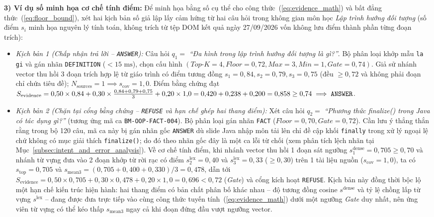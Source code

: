 \documentclass{IEEEtran}
\begin{document}
\textbf{3) Ví dụ số minh họa cơ chế tính điểm:}
Để minh họa bằng số cụ thể cho công thức~(\ref{eq:evidence_math}) và bất đẳng thức~(\ref{eq:floor_bound}), xét hai kịch bản số giả lập lấy cảm hứng từ hai câu hỏi trong không gian môn học \textit{Lập trình hướng đối tượng} (số điểm $s_i$ minh họa nguyên lý tính toán, không trích từ tệp DOM kết quả ngày 27/09/2026 vốn không lưu điểm thành phần từng đoạn trích):
\begin{itemize}
    \item \textit{Kịch bản 1 (Chấp nhận trả lời -- \texttt{ANSWER}):} Câu hỏi $q_1 =$ \textit{``Đa hình trong lập trình hướng đối tượng là gì?''}. Bộ phân loại khớp mẫu \texttt{la gi} và gán nhãn \texttt{DEFINITION} ($< 15\text{~ms}$), chọn cấu hình $(\textit{Top-K}=4, \textit{Floor}=0{,}72, \textit{Max}=3, \textit{Min}=1, \textit{Gate}=0{,}74)$. Giả sử nhánh vector thu hồi 3 đoạn trích hợp lệ từ giáo trình có điểm tương đồng $s_1 = 0{,}84, s_2 = 0{,}79, s_3 = 0{,}75$ (đều $\ge 0{,}72$ và không phải đoạn chỉ chứa tiêu đề); $N_{\text{sources}} = 1 \implies s_{\text{cov}} = 1{,}0$. Điểm bằng chứng đạt $S_{\text{evidence}} = 0{,}50 \times 0{,}84 + 0{,}30 \times \frac{0{,}84+0{,}79+0{,}75}{3} + 0{,}20 \times 1{,}0 = 0{,}420 + 0{,}238 + 0{,}200 = 0{,}858 \ge 0{,}74 \implies \text{\texttt{ANSWER}}$.
    \item \textit{Kịch bản 2 (Chặn tại cổng bằng chứng -- \texttt{REFUSE} và hạn chế ghép hai thang điểm):} Xét câu hỏi $q_2 =$ \textit{``Phương thức finalize() trong Java có tác dụng gì?''} (tương ứng mã ca \texttt{BM-OOP-FACT-004}). Bộ phân loại gán nhãn \texttt{FACT} ($\textit{Floor}=0{,}70, \textit{Gate}=0{,}72$). Cần lưu ý thẳng thắn rằng trong bộ 120 câu, mã ca này bị gán nhãn gốc \texttt{ANSWER} dù slide Java nhập môn tải lên chỉ đề cập khối \texttt{finally} trong xử lý ngoại lệ chứ không có mục giải thích \texttt{finalize()}; do đó theo nhãn gốc đây là một ca lỗi từ chối (xem phân tích lệch nhãn tại Mục~\ref{subsec:intent_and_error_analysis}). Về cơ chế tính điểm, khi nhánh vector thu hồi 1 đoạn sát ngưỡng $s_1^{\text{dense}} = 0{,}705 \ge 0{,}70$ và nhánh từ vựng đưa vào 2 đoạn khớp từ rời rạc có điểm $s_2^{\text{lex}} = 0{,}40$ và $s_3^{\text{lex}} = 0{,}33$ ($\ge 0{,}30$) trên 1 tài liệu nguồn ($s_{\text{cov}} = 1{,}0$), ta có $s_{\text{top}} = 0{,}705$ và $s_{\text{mean3}} = (0{,}705 + 0{,}400 + 0{,}330)/3 = 0{,}478$, dẫn tới $S_{\text{evidence}} = 0{,}50 \times 0{,}705 + 0{,}30 \times 0{,}478 + 0{,}20 \times 1{,}0 = 0{,}696 < 0{,}72$ (\textit{Gate}) và cổng kích hoạt \texttt{REFUSE}. Kịch bản này đồng thời bộc lộ một hạn chế kiến trúc hiện hành: hai thang điểm có bản chất phân bố khác nhau -- độ tương đồng cosine $s^{\text{dense}}$ và tỷ lệ chồng lấp từ vựng $s^{\text{lex}}$ -- đang được đưa trực tiếp vào cùng công thức tuyến tính~(\ref{eq:evidence_math}) dưới một ngưỡng \textit{Gate} duy nhất, nên ứng viên từ vựng có thể kéo thấp $s_{\text{mean3}}$ ngay cả khi đoạn đứng đầu vượt ngưỡng vector.
\end{itemize}
\end{document}
